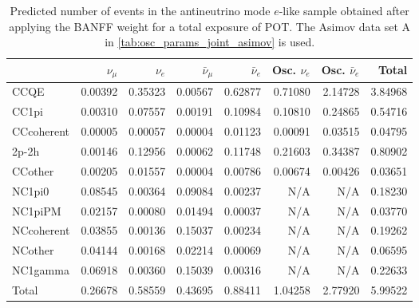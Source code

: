 
\begin{table}
\center
\begin{tabular} { | l ||r | r | r | r | r | r | | r | }
\hline
              & $\nu_\mu$            & $\nu_e$              & $\bar{\nu}_{\mu}$    & $\bar{\nu}_{e}$      & Osc. $\nu_e$         & Osc. $\bar{\nu}_{e}$ & Total                \\ \hline\hline
 CCQE         & 0.00392              & 0.35323              & 0.00567              & 0.62877              & 0.71080              & 2.14728              & 3.84968              \\ \hline
 CC1pi        & 0.00310              & 0.07557              & 0.00191              & 0.10984              & 0.10810              & 0.24865              & 0.54716              \\ \hline
 CCcoherent   & 0.00005              & 0.00057              & 0.00004              & 0.01123              & 0.00091              & 0.03515              & 0.04795              \\ \hline
 2p-2h        & 0.00146              & 0.12956              & 0.00062              & 0.11748              & 0.21603              & 0.34387              & 0.80902              \\ \hline
 CCother      & 0.00205              & 0.01557              & 0.00004              & 0.00786              & 0.00674              & 0.00426              & 0.03651              \\ \hline
 NC1pi0       & 0.08545              & 0.00364              & 0.09084              & 0.00237              & N/A                  & N/A                  & 0.18230              \\ \hline
 NC1piPM      & 0.02157              & 0.00080              & 0.01494              & 0.00037              & N/A                  & N/A                  & 0.03770              \\ \hline
 NCcoherent   & 0.03855              & 0.00136              & 0.15037              & 0.00234              & N/A                  & N/A                  & 0.19262              \\ \hline
 NCother      & 0.04144              & 0.00168              & 0.02214              & 0.00069              & N/A                  & N/A                  & 0.06595              \\ \hline
 NC1gamma     & 0.06918              & 0.00360              & 0.15039              & 0.00316              & N/A                  & N/A                  & 0.22633              \\ \hline
\hline
 Total        & 0.26678              & 0.58559              & 0.43695              & 0.88411              & 1.04258              & 2.77920              & 5.99522              \\ \hline
\end{tabular}
\caption{
Predicted number of events in the antineutrino mode $e$-like sample
obtained after applying the BANFF weight
for a total exposure of \TotalPotNuBarRunOneSevenC{} POT.
The Asimov data set A in \cref{tab:osc_params_joint_asimov} is used.
}
\label{tab:events_rhc1re_Asimov_A}
\end{table}


